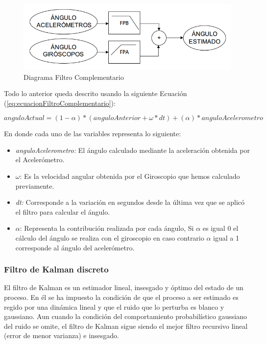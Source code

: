 \documentclass[12pt,a4paper]{article}
\begin{document}
\begin{figure}[H]
	\centering
	\includegraphics[scale=0.5]{images/FiltroComplementario}
	\caption{Diagrama Filtro Complementario}
	\label{fig:diagramafiltrocomplementario}
\end{figure}

Todo lo anterior queda descrito usando la siguiente Ecuación (\ref{eq:ecuacionFiltroComplementario}):

\begin{equation}
\label{eq:ecuacionFiltroComplementario}
anguloActual = (1-\alpha)*(anguloAnterior+\omega*dt)+(\alpha)*anguloAcelerometro
\end{equation}

En donde cada uno de las variables representa lo siguiente:
\begin{itemize}
	\item \textit{anguloAcelerometro:} El ángulo calculado mediante la aceleración obtenida por el Acelerómetro.
	\item $\omega$: Es la velocidad angular obtenida por el Giroscopio que hemos calculado previamente.
	\item \textit{dt:} Corresponde a la variación en segundos desde la última vez que se aplicó el filtro para calcular el ángulo.
	\item $\alpha$: Representa la contribución realizada por cada ángulo, Si $\alpha$ es igual 0 el cálculo del ángulo se realiza con el giroscopio en caso contrario $\alpha$ igual a 1 corresponde al ángulo del acelerómetro.
\end{itemize}

\subsubsection{Filtro de Kalman discreto}
El filtro de Kalman es un estimador lineal, insesgado y óptimo del estado de un proceso. En él se ha impuesto la condición de que el proceso a ser estimado es regido por una dinámica lineal y que el ruido que lo perturba es blanco y gaussiano. Aun cuando la condición del comportamiento probabilístico gaussiano del ruido se omite, el filtro de Kalman sigue siendo el mejor filtro recursivo lineal (error de menor varianza) e insesgado.
\end{document}
